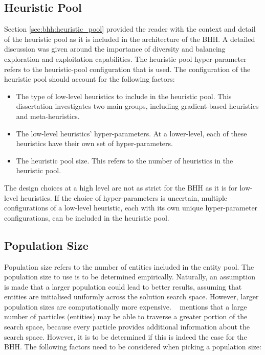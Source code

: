 \subsection{Heuristic Pool}\label{sec:bhh:hyper_parameters:heuristic_pool}

Section \ref{sec:bhh:heuristic_pool} provided the reader with the context and detail of the heuristic pool as it is included in the architecture of the \acs{BHH}. A detailed discussion was given around the importance of diversity and balancing exploration and exploitation capabilities. The heuristic pool hyper-parameter refers to the heuristic-pool configuration that is used. The configuration of the heuristic pool should account for the following factors:

\begin{itemize}
      \item The type of low-level heuristics to include in the heuristic pool. This dissertation investigates two main groups, including gradient-based heuristics and meta-heuristics.

      \item The low-level heuristics' hyper-parameters. At a lower-level, each of these heuristics have their own set of hyper-parameters.

      \item The heuristic pool size. This refers to the number of heuristics in the heuristic pool.
\end{itemize}

The design choices at a high level are not as strict for the \acs{BHH} as it is for low-level heuristics. If the choice of hyper-parameters is uncertain, multiple configurations of a low-level heuristic, each with its own unique hyper-parameter configurations, can be included in the heuristic pool.

\subsection{Population Size}\label{sec:bhh:hyper_parameters:population_size}

Population size refers to the number of entities included in the entity pool. The population size to use is to be determined empirically. Naturally, an assumption is made that a larger population could lead to better results, assuming that entities are initialised uniformly across the solution search space. However, larger population sizes are computationally more expensive. \citeauthor{ref:oldewage:2017}~\cite{ref:oldewage:2017} mentions that a large number of particles (entities) may be able to traverse a greater portion of the search space, because every particle provides additional information about the search space. However, it is to be determined if this is indeed the case for the \acs{BHH}. The following factors need to be considered when picking a population size:


